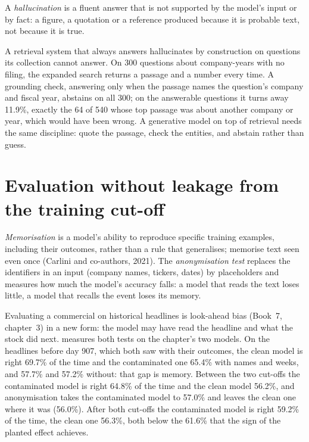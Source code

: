 \begin{definition}[Hallucination]\label{def:ml:large-language-models-in-finance:hallucination}
A \emph{hallucination} is a fluent answer that is not supported by the model's input or by fact: a
figure, a quotation or a reference produced because it is probable text, not because it is true.
\end{definition}

A retrieval system that always answers hallucinates by construction on questions its collection cannot answer. On 300
questions about company-years with no filing, the expanded search returns a passage and a number every time. A grounding
check, answering only when the passage names the question's company and fiscal year, abstains on all 300; on the answerable
questions it turns away 11.9\%, exactly the 64 of 540 whose top passage was about another company or year, which would have
been wrong. A generative model on top of retrieval needs the same discipline: quote the passage, check the entities, and
abstain rather than guess.

\section{Evaluation without leakage from the training cut-off}

\begin{definition}\label{def:ml:large-language-models-in-finance:memo}
\emph{Memorisation} is a model's ability to reproduce specific training examples, including their
outcomes, rather than a rule that generalises;  memorise text seen even once (Carlini and co-authors, 2021).
The \emph{anonymisation test} replaces the identifiers in an input (company names, tickers, dates)
by placeholders and measures how much the model's accuracy falls: a model that reads the text loses little, a model that
recalls the event loses its memory.
\end{definition}

Evaluating a commercial  on historical headlines is look-ahead bias (Book~7, chapter~3) in a new form: the
model may have read the headline and what the stock did next.  measures both tests on the
chapter's two models. On the headlines before day 907, which both saw with their outcomes, the clean model is right 69.7\% of
the time and the contaminated one 65.4\% with names and weeks, and 57.7\% and 57.2\% without: that gap is memory. Between the two cut-offs the contaminated model is right
64.8\% of the time and the clean model 56.2\%, and anonymisation takes the contaminated model to 57.0\% and leaves the clean
one where it was (56.0\%). After both cut-offs the contaminated model is right 59.2\% of the time, the clean one 56.3\%, both
below the 61.6\% that the sign of the planted effect achieves.

